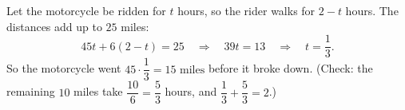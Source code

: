 Let the motorcycle be ridden for $t$ hours, so the rider walks for $2-t$ hours. The distances add up to $25$ miles:
\[
45t+6(2-t)=25\quad\Longrightarrow\quad 39t=13\quad\Longrightarrow\quad t=\dfrac{1}{3} .
\]
So the motorcycle went $45\cdot\dfrac{1}{3}=\boxed{15\text{ miles}}$ before it broke down. (Check: the remaining $10$ miles take $\dfrac{10}{6}=\dfrac{5}{3}$ hours, and $\dfrac{1}{3}+\dfrac{5}{3}=2$.)
